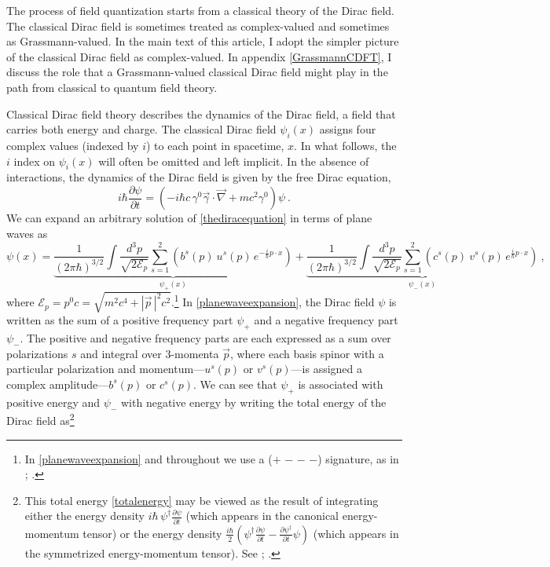 \documentclass[12pt,secnumarabic,amsmath,amssymb,balancelastpage,nofootinbib]{article}
\begin{document}
The process of field quantization starts from a classical theory of the Dirac field.  The classical Dirac field is sometimes treated as complex-valued and sometimes as Grassmann-valued.  In the main text of this article, I adopt the simpler picture of the classical Dirac field as complex-valued.  In appendix \ref{GrassmannCDFT}, I discuss the role that a Grassmann-valued classical Dirac field might play in the path from classical to quantum field theory.

Classical Dirac field theory describes the dynamics of the Dirac field, a field that carries both energy and charge.  The classical Dirac field $\psi_i(x)$ assigns four complex values (indexed by $i$) to each point in spacetime, $x$.  In what follows, the $i$ index on $\psi_i(x)$ will often be omitted and left implicit.  In the absence of interactions, the dynamics of the Dirac field is given by the free Dirac equation,
\begin{equation}
i\hbar \frac{\partial \psi}{\partial t}=\left(-i\hbar c \, \gamma^0 \vec{\gamma}\cdot\vec{\nabla}+ mc^2 \gamma^0 \right)\psi
\ .
\label{thediracequation}
\end{equation}
We can expand an arbitrary solution of \eqref{thediracequation} in terms of plane waves as
\begin{equation}
\psi (x) =\underbrace{\frac{1}{(2\pi\hbar)^{3/2}}\int{ \frac{d^3 p}{\sqrt{2 \mathcal{E}_p}} \sum_{s=1}^2 \left(b^s (p) \: u^s (p) \, e^{-\frac{i}{\hbar} p \cdot x}\right)}}_{\mbox{$\psi_+(x)$}}
+\underbrace{\frac{1}{(2\pi\hbar)^{3/2}}\int{ \frac{d^3 p}{\sqrt{2 \mathcal{E}_p}} \sum_{s=1}^2 \left(c^s (p) \: v^s (p) \,  e^{\frac{i}{\hbar} p \cdot x}\right)}}_{\mbox{$\psi_-(x)$}}
\ ,
\label{planewaveexpansion}
\end{equation}
where $\mathcal{E}_p = p^0 c = \sqrt{m^2 c^4 + |\vec{p}\,|^2 c^2}$.\footnote{In \eqref{planewaveexpansion} and throughout we use a ($+$ $-$ $-$ $-$) signature, as in \citet{bjorkendrell, bjorkendrellfields}; \citet{peskinschroeder}.}  In \eqref{planewaveexpansion}, the Dirac field $\psi$ is written as the sum of a positive frequency part $\psi_+$ and a negative frequency part $\psi_-$.  The positive and negative frequency parts are each expressed as a sum over polarizations $s$ and integral over 3-momenta $\vec{p}$, where each basis spinor with a particular polarization and momentum---$u^s (p)$ or $v^s (p)$---is assigned a complex amplitude---$b^s (p)$ or $c^s (p)$.  We can see that $\psi_+$ is associated with positive energy and $\psi_-$ with negative energy by writing the total energy of the Dirac field as\footnote{This total energy \eqref{totalenergy} may be viewed as the result of integrating either the energy density $i \hbar \, \psi^\dagger\frac{\partial \psi}{\partial t}$ (which appears in the canonical energy-momentum tensor) or the energy density $\frac{i \hbar}{2}\left(\psi^\dagger\frac{\partial \psi}{\partial t}-\frac{\partial \psi^\dagger}{\partial t}\psi\right)$ (which appears in the symmetrized energy-momentum tensor).  See \citet[pg.\ 419]{heitler}; \citet[pg.\ 219]{schweberQFT}.\label{twodensities}}
\end{document}
